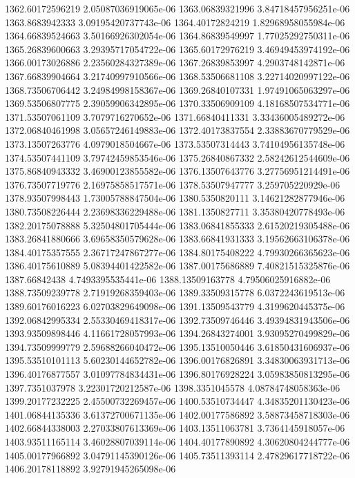{1362.60172596219 2.05087036919065e-06
1363.06839321996 3.84718457956251e-06
1363.8683942333 3.09195420737743e-06
1364.40172824219 1.82968958055984e-06
1364.66839524663 3.50166926302054e-06
1364.86839549997 1.77025292750311e-06
1365.26839600663 3.29395717054722e-06
1365.60172976219 3.46949453974192e-06
1366.00173026886 2.23560284327389e-06
1367.26839853997 4.2903748142871e-06
1367.66839904664 3.21740997910566e-06
1368.53506681108 3.22714020997122e-06
1368.73506706442 3.24984998158367e-06
1369.26840107331 1.97491065063297e-06
1369.53506807775 2.39059906342895e-06
1370.33506909109 4.18168507534771e-06
1371.53507061109 3.7079716270652e-06
1371.66840411331 3.33436005489272e-06
1372.06840461998 3.05657246149883e-06
1372.40173837554 2.33883670779529e-06
1373.13507263776 4.0979018504667e-06
1373.53507314443 3.74104956135748e-06
1374.53507441109 3.79742459853546e-06
1375.26840867332 2.58242612544609e-06
1375.86840943332 3.46900123855582e-06
1376.13507643776 3.27756951214491e-06
1376.73507719776 2.16975858517571e-06
1378.53507947777 3.259705220929e-06
1378.93507998443 1.73005788847504e-06
1380.5350820111 3.14621282877946e-06
1380.73508226444 2.23698336229488e-06
1381.1350827711 3.35380420778493e-06
1382.20175078888 5.32504801705444e-06
1383.06841855333 2.61520219305488e-06
1383.26841880666 3.69658350579628e-06
1383.66841931333 3.19562663106378e-06
1384.40175357555 2.36717247867277e-06
1384.80175408222 4.79930266365623e-06
1386.40175610889 5.08394401422582e-06
1387.00175686889 7.40821515325876e-06
1387.66842438 4.7493395535441e-06
1388.13509163778 4.79506025916882e-06
1388.73509239778 2.71919268359403e-06
1389.33509315778 6.0372243619513e-06
1389.60176016223 6.02703829649098e-06
1391.13509543779 4.3199620445375e-06
1392.06842995334 2.55330469418317e-06
1392.73509746446 3.49394831943506e-06
1393.93509898446 4.11661728057993e-06
1394.26843274001 3.93095270499829e-06
1394.73509999779 2.59688266040472e-06
1395.13510050446 3.61850431606937e-06
1395.53510101113 5.60230144652782e-06
1396.00176826891 3.34830063931713e-06
1396.40176877557 3.01097784834431e-06
1396.80176928224 3.05983850813295e-06
1397.7351037978 3.22301720212587e-06
1398.3351045578 4.08784748058363e-06
1399.20177232225 2.45500732269457e-06
1400.53510734447 4.34835201130423e-06
1401.06844135336 3.61372700671135e-06
1402.00177586892 3.58873458718303e-06
1402.66844338003 2.27033807613369e-06
1403.13511063781 3.7364145918057e-06
1403.93511165114 3.46028807039114e-06
1404.40177890892 4.30620804244777e-06
1405.00177966892 3.04791145390126e-06
1405.73511393114 2.47829617718722e-06
1406.20178118892 3.92791945265098e-06
}
